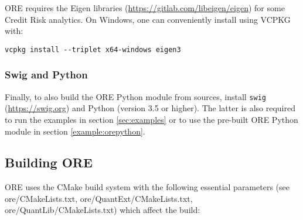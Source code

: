 ORE requires the Eigen libraries (\url{https://gitlab.com/libeigen/eigen}) for some Credit Risk analytics.
On Windows, one can conveniently install using VCPKG with:

\medskip
{\tt vcpkg install -{}-triplet x64-windows eigen3}

\subsubsection*{Swig and Python}

Finally, to also build the ORE Python module from sources, install {\tt swig} (\url{https://swig.org}) and
Python (version 3.5 or higher). The latter is also required to run the examples in section \ref{sec:examples}
or to use the pre-built ORE Python module in section \ref{example:orepython}. 

\subsection{Building ORE}\label{sec:build}

ORE uses the CMake build system with the following essential parameters (see ore/CMakeLists.txt,
ore/QuantExt/CMakeLists.txt, ore/QuantLib/CMakeLists.txt) which affect the build:

